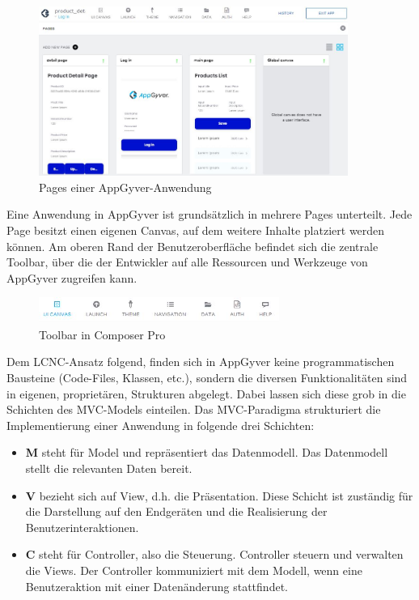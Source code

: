 \begin{figure}[htbp]
 \centering
 \includegraphics[width=0.9\textwidth]{Bilder/appgyver/2_2_Pages_in_AppGyver.jpg}
 \caption{Pages einer AppGyver-Anwendung}
\end{figure}

Eine Anwendung in AppGyver ist grundsätzlich in mehrere Pages unterteilt. Jede Page besitzt einen eigenen Canvas, auf dem weitere Inhalte platziert werden können. Am oberen Rand der Benutzeroberfläche befindet sich die zentrale Toolbar, über die der Entwickler auf alle Ressourcen und Werkzeuge von AppGyver zugreifen kann. 

\begin{figure}[htbp]
 \centering
 \includegraphics[width=0.7\textwidth]{Bilder/appgyver/2_3_AppGyver Toolbar.JPG}
 \caption{Toolbar in Composer Pro}
\end{figure}

Dem LCNC-Ansatz folgend, finden sich in AppGyver keine programmatischen Bausteine (Code-Files, Klassen, etc.), sondern die diversen Funktionalitäten sind in eigenen, proprietären, Strukturen abgelegt. Dabei lassen sich diese grob in die Schichten des MVC-Models einteilen. Das MVC-Paradigma strukturiert die Implementierung einer Anwendung in folgende drei Schichten: 
\begin{itemize}[noitemsep]
\item \textbf{M} steht für Model und repräsentiert das Datenmodell. Das Datenmodell stellt die relevanten Daten bereit.
\item \textbf{V} bezieht sich auf View, d.h. die Präsentation. Diese Schicht ist zuständig für die Darstellung auf den Endgeräten und die Realisierung der Benutzerinteraktionen.
\item \textbf{C} steht für Controller, also die Steuerung. Controller steuern und verwalten die Views. Der Controller kommuniziert mit dem Modell, wenn eine Benutzeraktion mit einer Datenänderung stattfindet.
\end{itemize}


